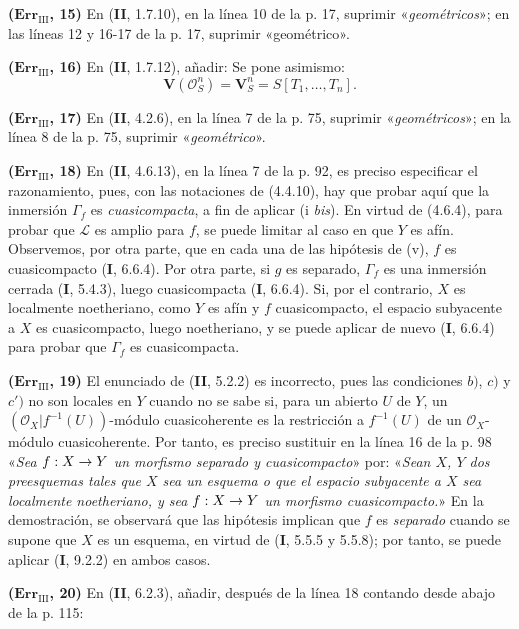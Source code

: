 \documentclass[10pt,oneside,openany]{book}
\theoremstyle{egaenv}\newtheorem*{env}{---}
\theoremstyle{egastatement}
\theoremstyle{egadescription}
\newcommand{\oldpage}[2][]{\marginnote{\normalfont\scriptsize\textbf{#1}\,|\,#2}\ignorespaces}
\renewcommand{\to}{\mathchoice{\longrightarrow}{\rightarrow}{\rightarrow}{\rightarrow}}
\begin{document}
\noindent\textbf{($\mathbf{Err}_{\mathrm{III}}$, 15)} En (\textbf{II}, 1.7.10), en
la línea 10 de la p. 17, suprimir «\emph{geométricos}»; en las líneas 12 y
16-17 de la p. 17, suprimir «geométrico».

\noindent\textbf{($\mathbf{Err}_{\mathrm{III}}$, 16)} En (\textbf{II}, 1.7.12),
añadir: Se pone asimismo:
\[
  \mathbf V(\mathscr O_S^n)=\mathbf V_S^n=S[T_1,\ldots,T_n].
\]

\noindent\textbf{($\mathbf{Err}_{\mathrm{III}}$, 17)} En (\textbf{II}, 4.2.6), en la
línea 7 de la p. 75, suprimir «\emph{geométricos}»; en la línea 8 de la p. 75,
suprimir «\emph{geométrico}».

\noindent\textbf{($\mathbf{Err}_{\mathrm{III}}$, 18)} En (\textbf{II}, 4.6.13), en la
línea 7 de la p. 92, es preciso especificar el razonamiento, pues, con las
notaciones de (4.4.10), hay que probar aquí que la inmersión $\Gamma_f$ es
\emph{cuasicompacta}, a fin de aplicar (i \emph{bis}). En virtud de (4.6.4), para
probar que $\mathscr L$ es amplio para $f$, se puede limitar al caso
en que $Y$ es afín. Observemos, por otra parte, que en cada una de las hipótesis
de (v), $f$ es cuasicompacto (\textbf I, 6.6.4). Por otra parte, si $g$ es
\oldpage[III]{221}
separado, $\Gamma_f$ es una inmersión cerrada (\textbf I, 5.4.3), luego cuasicompacta
(\textbf I, 6.6.4). Si, por el contrario, $X$ es localmente noetheriano, como $Y$ es
afín y $f$ cuasicompacto, el espacio subyacente a $X$ es cuasicompacto, luego
noetheriano, y se puede aplicar de nuevo (\textbf I, 6.6.4) para probar que $\Gamma_f$
es cuasicompacta.

\noindent\textbf{($\mathbf{Err}_{\mathrm{III}}$, 19)} El enunciado de (\textbf{II},
5.2.2) es incorrecto, pues las condiciones $b)$, $c)$ y $c')$ no son locales
en $Y$ cuando no se sabe si, para un abierto $U$ de $Y$, un
$(\mathscr O_X|f^{-1}(U))$-módulo cuasicoherente es la restricción a
$f^{-1}(U)$ de un $\mathscr O_X$-módulo cuasicoherente. Por tanto, es preciso
sustituir en la línea 16 de la p. 98 «\emph{Sea $f:X\to Y$ un morfismo separado
y cuasicompacto}» por: «\emph{Sean $X$, $Y$ dos preesquemas tales que $X$ sea
un esquema o que el espacio subyacente a $X$ sea localmente noetheriano, y sea
$f:X\to Y$ un morfismo cuasicompacto.}» En la demostración, se observará que
las hipótesis implican que $f$ es \emph{separado} cuando se supone que $X$ es
un esquema, en virtud de (\textbf I, 5.5.5 y 5.5.8); por tanto, se puede aplicar
(\textbf I, 9.2.2) en ambos casos.

\noindent\textbf{($\mathbf{Err}_{\mathrm{III}}$, 20)} En (\textbf{II}, 6.2.3),
añadir, después de la línea 18 contando desde abajo de la p. 115:
\end{document}
